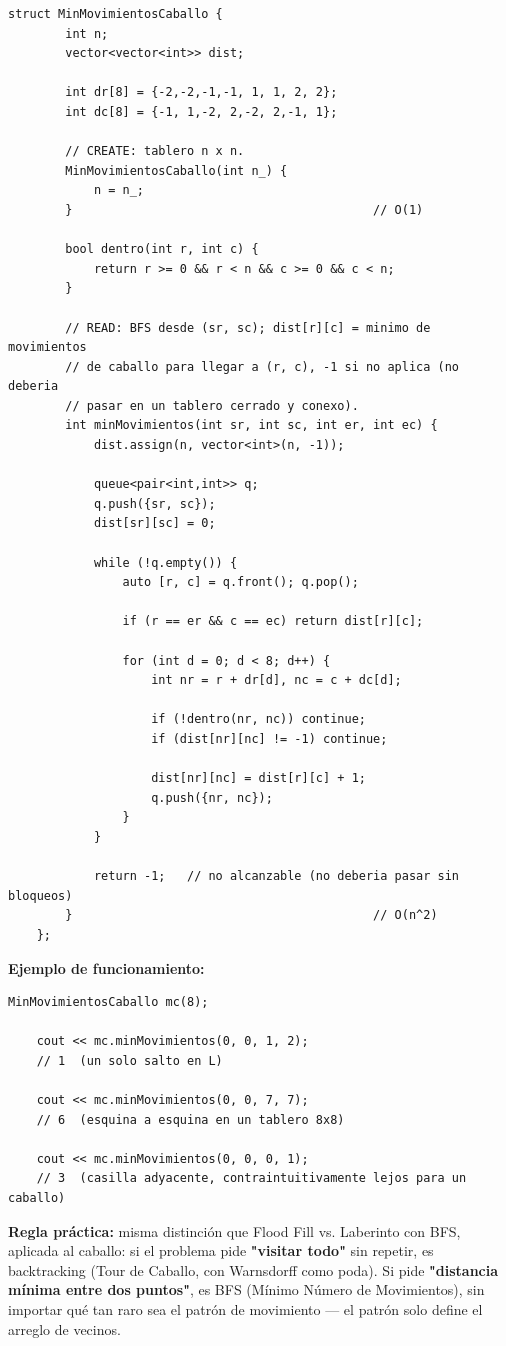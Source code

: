 \documentclass[10pt,a4paper,twocolumn]{article}
\begin{document}
\begin{lstlisting}[style=cpp]
	struct MinMovimientosCaballo {
		int n;
		vector<vector<int>> dist;
		
		int dr[8] = {-2,-2,-1,-1, 1, 1, 2, 2};
		int dc[8] = {-1, 1,-2, 2,-2, 2,-1, 1};
		
		// CREATE: tablero n x n.
		MinMovimientosCaballo(int n_) {
			n = n_;
		}                                          // O(1)
		
		bool dentro(int r, int c) {
			return r >= 0 && r < n && c >= 0 && c < n;
		}
		
		// READ: BFS desde (sr, sc); dist[r][c] = minimo de movimientos
		// de caballo para llegar a (r, c), -1 si no aplica (no deberia
		// pasar en un tablero cerrado y conexo).
		int minMovimientos(int sr, int sc, int er, int ec) {
			dist.assign(n, vector<int>(n, -1));
			
			queue<pair<int,int>> q;
			q.push({sr, sc});
			dist[sr][sc] = 0;
			
			while (!q.empty()) {
				auto [r, c] = q.front(); q.pop();
				
				if (r == er && c == ec) return dist[r][c];
				
				for (int d = 0; d < 8; d++) {
					int nr = r + dr[d], nc = c + dc[d];
					
					if (!dentro(nr, nc)) continue;
					if (dist[nr][nc] != -1) continue;
					
					dist[nr][nc] = dist[r][c] + 1;
					q.push({nr, nc});
				}
			}
			
			return -1;   // no alcanzable (no deberia pasar sin bloqueos)
		}                                          // O(n^2)
	};
\end{lstlisting}

\textbf{Ejemplo de funcionamiento:}

\begin{lstlisting}[style=cpp]
	MinMovimientosCaballo mc(8);
	
	cout << mc.minMovimientos(0, 0, 1, 2);
	// 1  (un solo salto en L)
	
	cout << mc.minMovimientos(0, 0, 7, 7);
	// 6  (esquina a esquina en un tablero 8x8)
	
	cout << mc.minMovimientos(0, 0, 0, 1);
	// 3  (casilla adyacente, contraintuitivamente lejos para un caballo)
\end{lstlisting}

\textbf{Regla práctica:} misma distinción que Flood Fill vs.
Laberinto con BFS, aplicada al caballo: si el problema pide
\textbf{"visitar todo"} sin repetir, es backtracking (Tour de
Caballo, con Warnsdorff como poda). Si pide \textbf{"distancia
	mínima entre dos puntos"}, es BFS (Mínimo Número de Movimientos), sin
importar qué tan raro sea el patrón de movimiento — el patrón solo
define el arreglo de vecinos.
\end{document}
